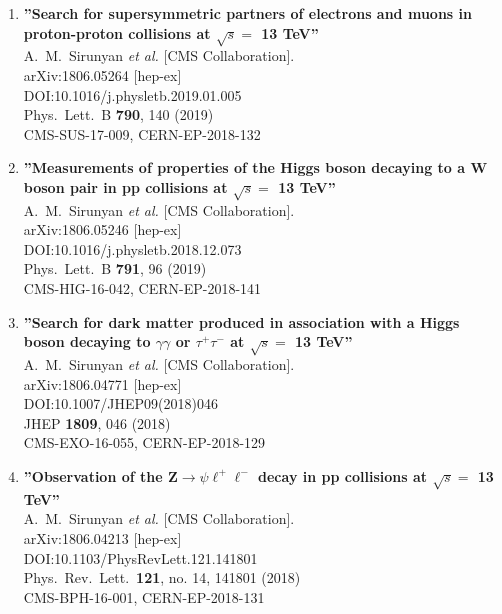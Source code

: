 \begin{enumerate}
\item%
{\bf ''Search for supersymmetric partners of electrons and muons in proton-proton collisions at $\sqrt{s}=$ 13 TeV''}
  \\{}A.~M.~Sirunyan {\it et al.} [CMS Collaboration].
  \\{}arXiv:1806.05264 [hep-ex]
  \\{}DOI:10.1016/j.physletb.2019.01.005
  \\{}Phys.\ Lett.\ B {\bf 790}, 140 (2019)
  \\{}CMS-SUS-17-009, CERN-EP-2018-132

\item%
{\bf ''Measurements of properties of the Higgs boson decaying to a W boson pair in pp collisions at $\sqrt{s}=$ 13 TeV''}
  \\{}A.~M.~Sirunyan {\it et al.} [CMS Collaboration].
  \\{}arXiv:1806.05246 [hep-ex]
  \\{}DOI:10.1016/j.physletb.2018.12.073
  \\{}Phys.\ Lett.\ B {\bf 791}, 96 (2019)
  \\{}CMS-HIG-16-042, CERN-EP-2018-141

\item%
{\bf ''Search for dark matter produced in association with a Higgs boson decaying to $\gamma\gamma$ or $\tau^+\tau^-$ at $\sqrt{s} =$ 13 TeV''}
  \\{}A.~M.~Sirunyan {\it et al.} [CMS Collaboration].
  \\{}arXiv:1806.04771 [hep-ex]
  \\{}DOI:10.1007/JHEP09(2018)046
  \\{}JHEP {\bf 1809}, 046 (2018)
  \\{}CMS-EXO-16-055, CERN-EP-2018-129

\item%
{\bf ''Observation of the Z$\to\psi\ell^+\ell^-$ decay in pp collisions at $\sqrt{s}=$ 13 TeV''}
  \\{}A.~M.~Sirunyan {\it et al.} [CMS Collaboration].
  \\{}arXiv:1806.04213 [hep-ex]
  \\{}DOI:10.1103/PhysRevLett.121.141801
  \\{}Phys.\ Rev.\ Lett.\  {\bf 121}, no. 14, 141801 (2018)
  \\{}CMS-BPH-16-001, CERN-EP-2018-131


\end{enumerate}

